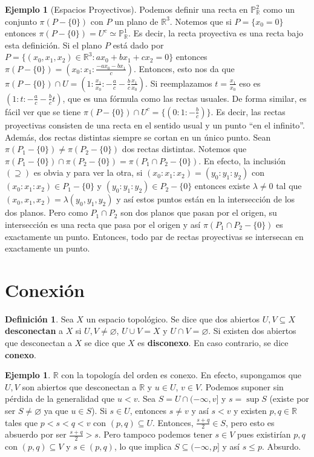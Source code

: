\documentclass[12pt]{book}
\theoremstyle{definition}
\newtheorem{defn}[teo]{Definición}
\newtheorem{ex}[teo]{Ejemplo}
\newcommand{\RR}{\mathbb{R}}      %
\let\emptyset\varnothing
\begin{document}
\begin{ex}[Espacios Proyectivos]
Podemos definir una recta en $\mathbb{P}_\RR^2$ como un conjunto $\pi(P-\{0\})$ con $P$ un plano de $\RR^3$. Notemos que si $P=\{x_0=0\}$ entonces $\pi(P-\{0\}) = U^c\simeq \mathbb{P}_\RR^1$. Es decir, la recta proyectiva es una recta bajo esta definición. Si el plano $P$ está dado por $P=\{(x_0,x_1,x_2)\in\RR^3 : ax_0 + bx_1 + cx_2 = 0\}$ entonces $\pi(P-\{0\}) = (x_0:x_1:\frac{-ax_0 - bx_1}{c})$. Entonces, esto nos da que $\pi(P-\{0\})\cap U = (1:\frac{x_1}{x_0} : -\frac{a}{c} - \frac{b}{c}\frac{x_1}{x_0})$. Si reemplazamos $t=\frac{x_1}{x_0}$ eso es $(1:t:-\frac{a}{c}-\frac{b}{c}t)$, que es una fórmula como las rectas usuales. De forma similar, es fácil ver que se tiene $\pi(P-\{0\}) \cap U^c = \{(0:1:-\frac{b}{c})\}$. Es decir, las rectas proyectivas consisten de una recta en el sentido usual y un punto "`en el infinito"'. Además, dos rectas distintas siempre se cortan en un único punto. Sean $\pi(P_1-\{0\})\neq \pi(P_2-\{0\})$ dos rectas distintas. Notemos que $\pi(P_1-\{0\})\cap \pi(P_2-\{0\}) = \pi(P_1\cap P_2 - \{0\})$. En efecto, la inclusión $(\supseteq)$ es obvia y para ver la otra, si $(x_0:x_1:x_2)=(y_0:y_1:y_2)$ con $(x_0:x_1:x_2)\in P_1-\{0\}$ y $(y_0:y_1:y_2)\in P_2-\{0\}$ entonces existe $\lambda\neq 0$ tal que $(x_0,x_1,x_2) = \lambda (y_0,y_1,y_2)$ y así estos puntos están en la intersección de los dos planos. Pero como $P_1\cap P_2$ son dos planos que pasan por el origen, su intersección es una recta que pasa por el origen y así $\pi(P_1\cap P_2 - \{0\})$ es exactamente un punto. Entonces, todo par de rectas proyectivas se intersecan en exactamente un punto.

\end{ex}

\section{Conexión}

\begin{defn}
Sea $X$ un espacio topológico. Se dice que dos abiertos $U,V\subseteq X$ \textbf{desconectan} a $X$ si $U,V\neq \emptyset$, $U\cup V = X$ y $U\cap V = \emptyset$. Si existen dos abiertos que desconectan a $X$ se dice que $X$ es \textbf{disconexo}. En caso contrario, se dice \textbf{conexo}.
\end{defn}

\begin{ex}
$\RR$ con la topología del orden es conexo. En efecto, supongamos que $U,V$ son abiertos que desconectan a $\RR$ y $u\in U$, $v\in V$. Podemos suponer sin pérdida de la generalidad que $u<v$. Sea $S=U\cap (-\infty,v]$ y $s=\sup S$ (existe por ser $S\neq\emptyset$ ya que $u\in S$). Si $s\in U$, entonces $s\neq v$ y así $s<v$ y existen $p,q\in\RR$ tales que $p<s<q<v$ con $(p,q)\subseteq U$. Entonces, $\frac{s+q}{2}\in S$, pero esto es absuerdo por ser $\frac{s+q}{2}> s$. Pero tampoco podemos tener $s\in V$ pues existirían $p,q$ con $(p,q)\subseteq V$ y $s\in (p,q)$, lo que implica $S\subseteq (-\infty, p]$ y así $s\leq p$. Absurdo.
\end{ex}
\end{document}
